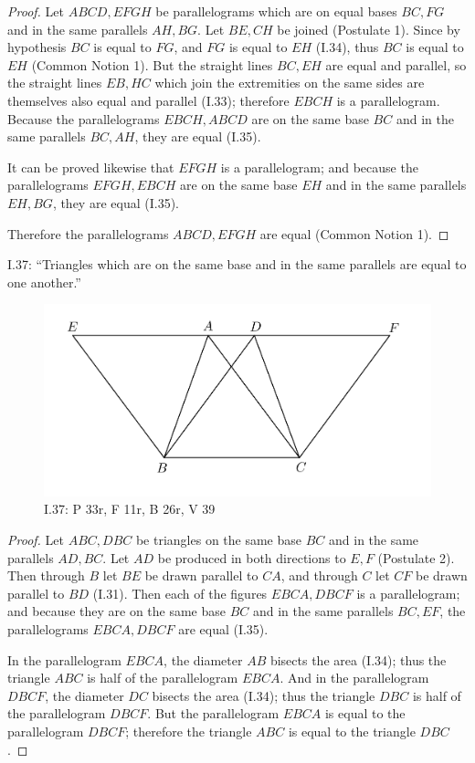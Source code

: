 \documentclass{article}
\begin{document}
\begin{proof}
Let $ABCD,EFGH$ be parallelograms which are on equal bases $BC,FG$ and in the same parallels $AH,BG$.
Let $BE,CH$ be joined (Postulate 1). Since by hypothesis $BC$ is equal to $FG$,
and $FG$ is equal to $EH$ (I.34), thus $BC$ is equal to $EH$ (Common Notion 1).
But the straight lines $BC,EH$ are equal and parallel, so the straight lines $EB,HC$ which join the extremities on the same
sides are themselves also equal and parallel (I.33); therefore $EBCH$ is a parallelogram.
Because the parallelograms $EBCH,ABCD$ are on the same base $BC$ and in the same parallels $BC,AH$,
they are equal (I.35).

It can be proved likewise that $EFGH$ is a parallelogram; and because the parallelograms $EFGH,EBCH$ are on the same
base $EH$ and in the same parallels $EH,BG$, they are equal (I.35). 

Therefore the parallelograms $ABCD,EFGH$ are equal (Common Notion 1).
\end{proof}

I.37: ``Triangles which are on the same base and in the same
parallels are equal to one another.''

\begin{figure}
\begin{center}
\includegraphics{I37.png}
\end{center}
\caption{I.37: P 33r, F 11r, B 26r, V 39}
\label{I37}
\end{figure}

\begin{proof}
Let $ABC,DBC$ be triangles on the same base $BC$ and in the same parallels $AD,BC$.
Let $AD$ be produced in both directions to $E,F$ (Postulate 2). Then through $B$ let $BE$ be drawn parallel
to $CA$, and through $C$ let $CF$ be drawn parallel to $BD$ (I.31). 
Then each of the figures $EBCA,DBCF$ is a parallelogram; and because they are on the same
base $BC$ and in the same parallels $BC,EF$, the parallelograms $EBCA,DBCF$ are equal (I.35).

In the parallelogram $EBCA$, the diameter $AB$ bisects the area (I.34); thus the triangle
$ABC$ is half of the parallelogram $EBCA$. And in the parallelogram $DBCF$, the diameter
$DC$ bisects the area (I.34); thus the triangle
$DBC$ is half of the parallelogram $DBCF$.
But the parallelogram $EBCA$ is equal to the parallelogram $DBCF$; therefore the triangle
$ABC$ is equal to the triangle $DBC$.
\end{proof}
\end{document}
